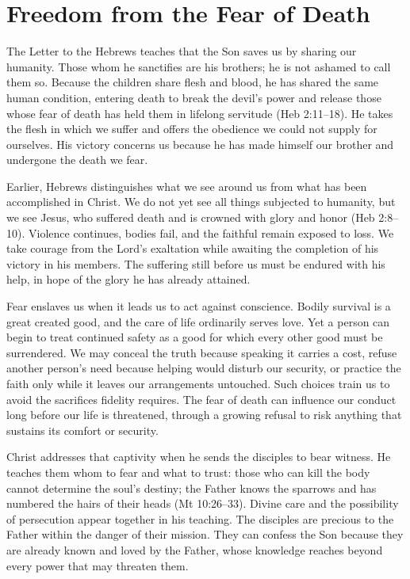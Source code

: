 \section{Freedom from the Fear of Death}

The Letter to the Hebrews teaches that the Son saves us by sharing our humanity. Those whom he sanctifies are his brothers; he is not ashamed to call them so. Because the children share flesh and blood, he has shared the same human condition, entering death to break the devil's power and release those whose fear of death has held them in lifelong servitude (Heb 2:11--18). He takes the flesh in which we suffer and offers the obedience we could not supply for ourselves. His victory concerns us because he has made himself our brother and undergone the death we fear.

Earlier, Hebrews distinguishes what we see around us from what has been accomplished in Christ. We do not yet see all things subjected to humanity, but we see Jesus, who suffered death and is crowned with glory and honor (Heb 2:8--10). Violence continues, bodies fail, and the faithful remain exposed to loss. We take courage from the Lord's exaltation while awaiting the completion of his victory in his members. The suffering still before us must be endured with his help, in hope of the glory he has already attained.

Fear enslaves us when it leads us to act against conscience. Bodily survival is a great created good, and the care of life ordinarily serves love. Yet a person can begin to treat continued safety as a good for which every other good must be surrendered. We may conceal the truth because speaking it carries a cost, refuse another person's need because helping would disturb our security, or practice the faith only while it leaves our arrangements untouched. Such choices train us to avoid the sacrifices fidelity requires. The fear of death can influence our conduct long before our life is threatened, through a growing refusal to risk anything that sustains its comfort or security.

Christ addresses that captivity when he sends the disciples to bear witness. He teaches them whom to fear and what to trust: those who can kill the body cannot determine the soul's destiny; the Father knows the sparrows and has numbered the hairs of their heads (Mt 10:26--33). Divine care and the possibility of persecution appear together in his teaching. The disciples are precious to the Father within the danger of their mission. They can confess the Son because they are already known and loved by the Father, whose knowledge reaches beyond every power that may threaten them.

